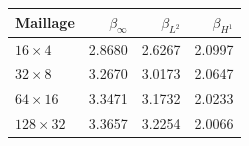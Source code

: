 \begin{tabular}{lrrr}
\toprule
Maillage & \(\beta_\infty\) & \(\beta_{L^2}\) & \(\beta_{H^1}\) \\
\midrule
\(16\times4\) & 2.8680 & 2.6267 & 2.0997 \\
\(32\times8\) & 3.2670 & 3.0173 & 2.0647 \\
\(64\times16\) & 3.3471 & 3.1732 & 2.0233 \\
\(128\times32\) & 3.3657 & 3.2254 & 2.0066 \\
\bottomrule
\end{tabular}
